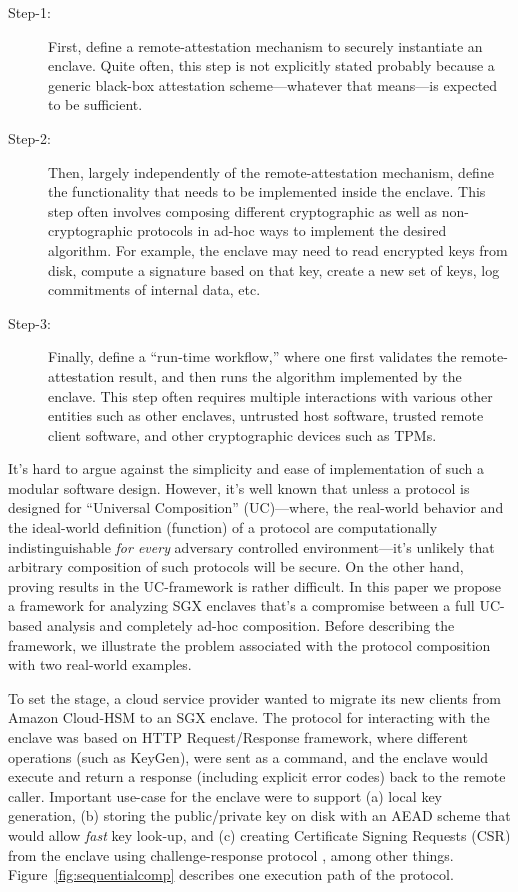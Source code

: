 \documentclass[letterpaper]{article}
\newcommand{\uc}{\textsf{UC}}
\begin{document}
  \begin{description}
    \item[Step-1:] First, define a remote-attestation mechanism to
      securely instantiate an enclave. Quite often, this step is not
      explicitly stated probably because a generic black-box
      attestation scheme---whatever that means---is expected to be
      sufficient.
    \item[Step-2:] Then, largely independently of the
      remote-attestation mechanism, define the functionality that
      needs to be implemented inside the enclave. This step often
      involves composing different cryptographic as well as
      non-cryptographic protocols in ad-hoc ways to implement the
      desired algorithm. For example, the enclave may need to read
      encrypted keys from disk, compute a signature based on that key,
      create a new set of keys, log commitments of internal data, etc.
    \item[Step-3:] Finally, define a ``run-time workflow,'' where one
      first validates the remote-attestation result, and then runs the
      algorithm implemented by the enclave. This step often requires
      multiple interactions with various other entities such as other
      enclaves, untrusted host software, trusted remote client
      software, and other cryptographic devices such as TPMs.
  \end{description}

  It's hard to argue against the simplicity and ease of implementation
  of such a modular software design. However, it's well known
  \cite{ucframework, cramerthesis} that unless a protocol is designed
  for ``\textsf{Universal Composition}'' (\uc)---where, the real-world
  behavior and the ideal-world definition (function) of a protocol are
  computationally indistinguishable \textit{for every} adversary
  controlled environment---it's unlikely that arbitrary composition of
  such protocols will be secure. On the other hand, proving results in
  the \uc-framework is rather difficult. In this paper we propose a
  framework for analyzing SGX enclaves that's a compromise between a
  full \uc-based analysis and completely ad-hoc composition. Before
  describing the framework, we illustrate the problem associated with
  the protocol composition with two real-world examples.

  To set the stage, a cloud service provider wanted to migrate its new
  clients from Amazon Cloud-HSM to an SGX enclave. The protocol for
  interacting with the enclave was based on HTTP Request/Response
  framework, where different operations (such as \textsf{KeyGen}),
  were sent as a command, and the enclave would execute and return a
  response (including explicit error codes) back to the remote caller.
  Important use-case for the enclave were to support (a) local key
  generation, (b) storing the public/private key on disk with an AEAD
  scheme that would allow \textit{fast} key look-up, and (c) creating
  Certificate Signing Requests (CSR) from the enclave using
  challenge-response protocol \cite[\S5.2.8.3]{rfc4210}, among other
  things. Figure~\ref{fig:sequentialcomp} describes one execution path
  of the protocol.
\end{document}
